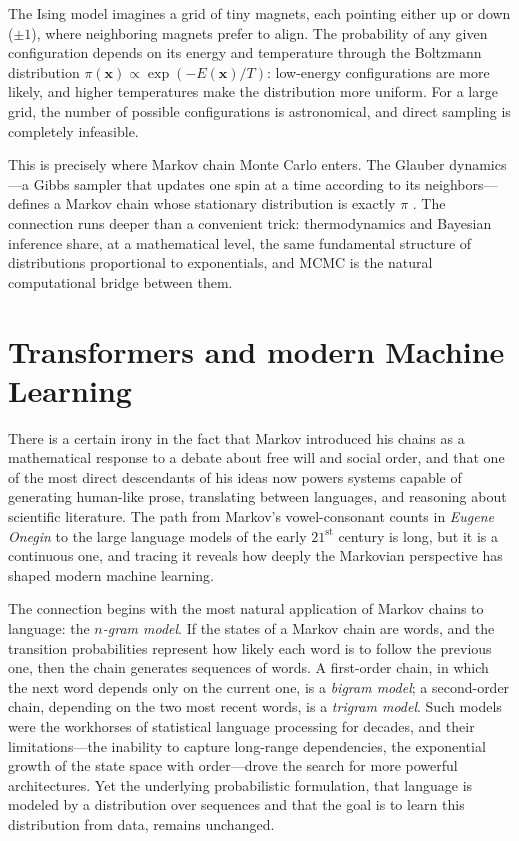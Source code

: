 \medskip

The Ising model imagines a grid of tiny magnets, each pointing either up or down ($\pm 1$), where neighboring magnets prefer to align. The probability of any given configuration depends on its energy and temperature through the Boltzmann distribution $\pi(\mathbf{x}) \propto \exp(-E(\mathbf{x})/T)$: low-energy configurations are more likely, and higher temperatures make the distribution more uniform. For a large grid, the number of possible configurations is astronomical, and direct sampling is completely infeasible.

\medskip

This is precisely where Markov chain Monte Carlo enters. The Glauber dynamics---a Gibbs sampler that updates one spin at a time according to its neighbors---defines a Markov chain whose stationary distribution is exactly $\pi$ \cite{glauber_1963_ising}. The connection runs deeper than a convenient trick: thermodynamics and Bayesian inference share, at a mathematical level, the same fundamental structure of distributions proportional to exponentials, and MCMC is the natural computational bridge between them.

\section{Transformers and modern Machine Learning}

There is a certain irony in the fact that Markov introduced his chains as a mathematical response to a debate about free will and social order, and that one of the most direct descendants of his ideas now powers systems capable of generating human-like prose, translating between languages, and reasoning about scientific literature. The path from Markov's vowel-consonant counts in \textit{Eugene Onegin} to the large language models of the early $21^{\text{st}}$ century is long, but it is a continuous one, and tracing it reveals how deeply the Markovian perspective has shaped modern machine learning.

\medskip

The connection begins with the most natural application of Markov chains to language: the \textit{$n$-gram model}. If the states of a Markov chain are words, and the transition probabilities represent how likely each word is to follow the previous one, then the chain generates sequences of words. A first-order chain, in which the next word depends only on the current one, is a \textit{bigram model}; a second-order chain, depending on the two most recent words, is a \textit{trigram model}. Such models were the workhorses of statistical language processing for decades, and their limitations---the inability to capture long-range dependencies, the exponential growth of the state space with order---drove the search for more powerful architectures. Yet the underlying probabilistic formulation, that language is modeled by a distribution over sequences and that the goal is to learn this distribution from data, remains unchanged.

